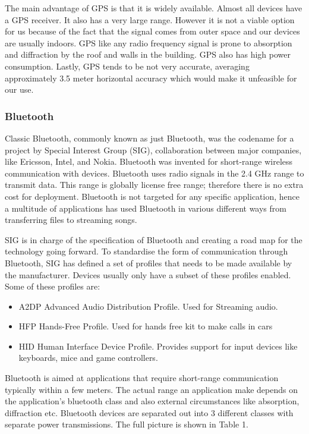 The main advantage of GPS is that it is widely available.
Almost all devices have a GPS receiver. It also has a very large
range. However it is not a viable option for us because of the fact
that the signal comes from outer space and our devices are usually
indoors. GPS like any radio frequency signal is prone to absorption
and diffraction by the roof and walls in the building. GPS also has
high power consumption. Lastly, GPS tends to be not very accurate, averaging
approximately 3.5 meter horizontal accuracy\cite{gps-accuracy} which would make it unfeasible for our use. 


\subsubsection{Bluetooth}

Classic Bluetooth, commonly known as just Bluetooth, was the codename for
a project by Special Interest Group (SIG), collaboration between major
companies, like Ericsson, Intel, and Nokia\cite{bluetooth-wiki}. Bluetooth was invented
for short-range wireless communication with devices. Bluetooth uses
radio signals in the 2.4 GHz range to transmit data. This range is
globally license free range; therefore there is no extra cost for
deployment. Bluetooth is not targeted for any specific application, hence
a multitude of applications has used Bluetooth in various different
ways from transferring files to streaming songs.

SIG is in charge of the specification of Bluetooth and creating a
road map for the technology going forward. To standardise the form of communication
through Bluetooth, SIG has defined a set of profiles that needs to
be made available by the manufacturer. Devices usually only have a
subset of these profiles enabled\cite{bluetooth-profiles}. Some of these profiles are: 
\begin{itemize}
\item A2DP Advanced Audio Distribution Profile. Used for Streaming audio. 
\item HFP Hands-Free Profile. Used for hands free kit to make calls in cars 
\item HID Human Interface Device Profile. Provides support for input devices
like keyboards, mice and game controllers.
\end{itemize}
Bluetooth is aimed at applications that require short-range communication
typically within a few meters. The actual range an application make depends
on the application's bluetooth class and also external circumstances
like absorption, diffraction etc. Bluetooth devices are separated
out into 3 different classes with separate power transmissions\cite{bluetooth-chalmers}. The
full picture is shown in Table 1.

